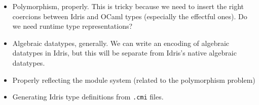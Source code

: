 \documentclass[a4paper,twocolumn]{article}
\begin{document}
\begin{itemize}
\item Polymorphism, properly. This is tricky because we need to insert
  the right coercions between Idris and OCaml types (especially the
  effectful ones). Do we need runtime type representations?
\item Algebraic datatypes, generally. We can write an encoding of
  algebraic datatypes in Idris, but this will be separate from Idris's
  native algebraic datatypes.
\item Properly reflecting the module system (related to the
  polymorphism problem)
\item Generating Idris type definitions from \texttt{.cmi} files.
\end{itemize}
\end{document}
